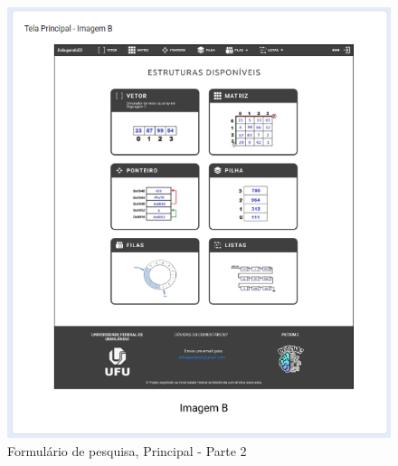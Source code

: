 \begin{figure}[!h]
	\begin{center}
	    \includegraphics[scale=0.6]{figs/Form/14.png}
	\end{center}
	\caption{\label{AP_PP02}Formulário de pesquisa, Principal - Parte 2}
\end{figure}

\newpage

